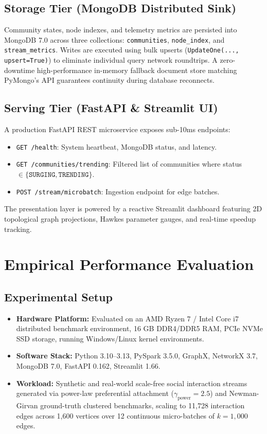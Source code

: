 \documentclass[10pt,journal,compsoc]{IEEEtran}
\begin{document}
\subsection{Storage Tier (MongoDB Distributed Sink)}
Community states, node indexes, and telemetry metrics are persisted into MongoDB 7.0 across three collections: \texttt{communities}, \texttt{node\_index}, and \texttt{stream\_metrics}. Writes are executed using bulk upserts (\texttt{UpdateOne(..., upsert=True)}) to eliminate individual query network roundtrips. A zero-downtime high-performance in-memory fallback document store matching PyMongo's API guarantees continuity during database reconnects.

\subsection{Serving Tier (FastAPI \& Streamlit UI)}
A production FastAPI REST microservice exposes sub-10ms endpoints:
\begin{itemize}
    \item \texttt{GET /health}: System heartbeat, MongoDB status, and latency.
    \item \texttt{GET /communities/trending}: Filtered list of communities where status $\in \{\texttt{SURGING}, \texttt{TRENDING}\}$.
    \item \texttt{POST /stream/microbatch}: Ingestion endpoint for edge batches.
\end{itemize}
The presentation layer is powered by a reactive Streamlit dashboard featuring 2D topological graph projections, Hawkes parameter gauges, and real-time speedup tracking.

\section{Empirical Performance Evaluation}\label{sec:evaluation}

\subsection{Experimental Setup}
\begin{itemize}
    \item \textbf{Hardware Platform:} Evaluated on an AMD Ryzen 7 / Intel Core i7 distributed benchmark environment, 16 GB DDR4/DDR5 RAM, PCIe NVMe SSD storage, running Windows/Linux kernel environments.
    \item \textbf{Software Stack:} Python 3.10--3.13, PySpark 3.5.0, GraphX, NetworkX 3.7, MongoDB 7.0, FastAPI 0.162, Streamlit 1.66.
    \item \textbf{Workload:} Synthetic and real-world scale-free social interaction streams generated via power-law preferential attachment ($\gamma_{\text{power}} = 2.5$) and Newman-Girvan ground-truth clustered benchmarks, scaling to 11,728 interaction edges across 1,600 vertices over 12 continuous micro-batches of $k = 1,000$ edges.
\end{itemize}
\end{document}
